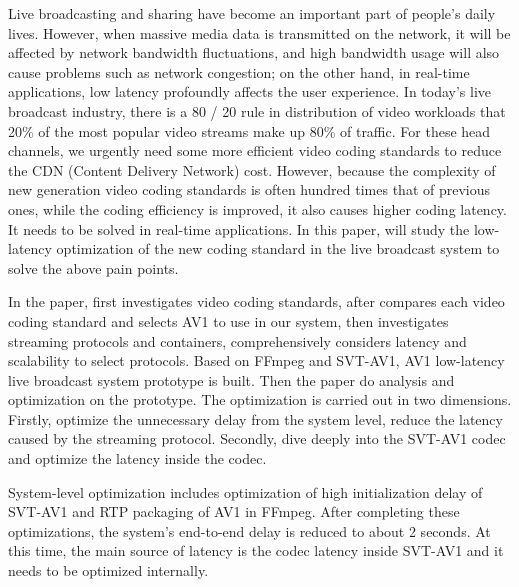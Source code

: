 \begin{enabstract}
  Live broadcasting and sharing have become an important part of people's daily lives. However, when massive media data is transmitted on the network, it will be affected by network bandwidth fluctuations, and high bandwidth usage will also cause problems such as network congestion; on the other hand, in real-time applications, low latency profoundly affects the user experience. In today's live broadcast industry, there is a 80 / 20 rule in distribution of video workloads that 20\% of the most popular video streams make up 80\% of traffic. For these head channels, we urgently need some more efficient video coding standards to reduce the CDN (Content Delivery Network) cost. However, because the complexity of new generation video coding standards is often hundred times that of previous ones, while the coding efficiency is improved, it also causes higher coding latency. It needs to be solved in real-time applications. In this paper, will study the low-latency optimization of the new coding standard in the live broadcast system to solve the above pain points.

  In the paper, first investigates video coding standards, after compares each video coding standard and selects AV1 to use in our system, then investigates streaming protocols and containers, comprehensively considers latency and scalability to select protocols. Based on FFmpeg and SVT-AV1, AV1 low-latency live broadcast system prototype is built. Then the paper do analysis and optimization on the prototype. The optimization is carried out in two dimensions. Firstly, optimize the unnecessary delay from the system level, reduce the latency caused by the streaming protocol. Secondly, dive deeply into the SVT-AV1 codec and optimize the latency inside the codec.

  System-level optimization includes optimization of high initialization delay of SVT-AV1 and RTP packaging of AV1 in FFmpeg. After completing these optimizations, the system's end-to-end delay is reduced to about 2 seconds. At this time, the main source of latency is the codec latency inside SVT-AV1 and it needs to be optimized internally.


\end{enabstract}
